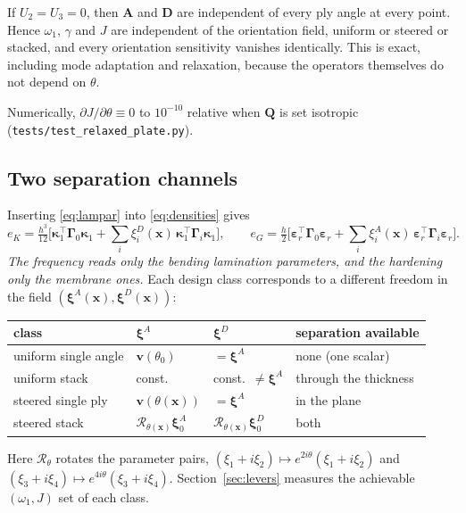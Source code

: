 \begin{corollary}\label{cor:iso}
If $U_2=U_3=0$, then $\bm A$ and $\bm D$ are independent of every ply angle at every point.
Hence $\omega_1$, $\gamma$ and $J$ are independent of the orientation field, uniform or
steered or stacked, and every orientation sensitivity vanishes identically. This is exact,
including mode adaptation and relaxation, because the operators themselves do not depend
on $\theta$.
\end{corollary}
\noindent Numerically, $\partial J/\partial\theta\equiv0$ to $10^{-10}$ relative when
$\bm Q$ is set isotropic (\texttt{tests/test\_relaxed\_plate.py}).

\subsection{Two separation channels}\label{sec:channels}
Inserting \eqref{eq:lampar} into \eqref{eq:densities} gives
\begin{equation}
e_K=\tfrac{h^3}{12}\Big[\bm\kappa_1^{\!\top}\bm\Gamma_0\bm\kappa_1+\sum_i\xi^D_i(\bm x)\,
\bm\kappa_1^{\!\top}\bm\Gamma_i\bm\kappa_1\Big],\qquad
e_G=\tfrac{h}{2}\Big[\bm\varepsilon_r^{\!\top}\bm\Gamma_0\bm\varepsilon_r+\sum_i\xi^A_i(\bm x)\,
\bm\varepsilon_r^{\!\top}\bm\Gamma_i\bm\varepsilon_r\Big].
\label{eq:channels}
\end{equation}
\emph{The frequency reads only the bending lamination parameters, and the hardening only
the membrane ones.} Each design class corresponds to a different freedom in the field
$(\bm\xi^A(\bm x),\bm\xi^D(\bm x))$:

\begin{center}\small
\begin{tabular}{@{}llll@{}}
\toprule
class & $\bm\xi^A$ & $\bm\xi^D$ & separation available\\ \midrule
uniform single angle & $\bm v(\theta_0)$ & $=\bm\xi^A$ & none (one scalar)\\
uniform stack & const. & const.\ $\ne\bm\xi^A$ & through the thickness\\
steered single ply & $\bm v(\theta(\bm x))$ & $=\bm\xi^A$ & in the plane\\
steered stack & $\mathcal R_{\theta(\bm x)}\bm\xi^A_0$ & $\mathcal R_{\theta(\bm x)}\bm\xi^D_0$ & both\\
\bottomrule
\end{tabular}
\end{center}

\noindent Here $\mathcal R_\theta$ rotates the parameter pairs,
$(\xi_1+i\xi_2)\mapsto e^{2i\theta}(\xi_1+i\xi_2)$ and
$(\xi_3+i\xi_4)\mapsto e^{4i\theta}(\xi_3+i\xi_4)$. Section~\ref{sec:levers} measures the
achievable $(\omega_1,J)$ set of each class.

